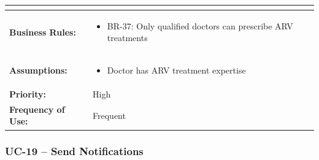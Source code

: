 \documentclass[12pt,a4paper]{article}
\begin{document}
\begin{longtable}{|p{4.5cm}|p{10.5cm}|}
\begin{itemize}
\end{itemize} \\
\hline
\textbf{Business Rules:} &
\begin{itemize}
  \item BR-37: Only qualified doctors can prescribe ARV treatments
\end{itemize} \\
\hline
\textbf{Assumptions:} &
\begin{itemize}
  \item Doctor has ARV treatment expertise
\end{itemize} \\
\hline
\textbf{Priority:} & High \\
\hline
\textbf{Frequency of Use:} & Frequent \\
\hline
\end{longtable}

\subsubsection{UC-19 – Send Notifications}
\end{document}
